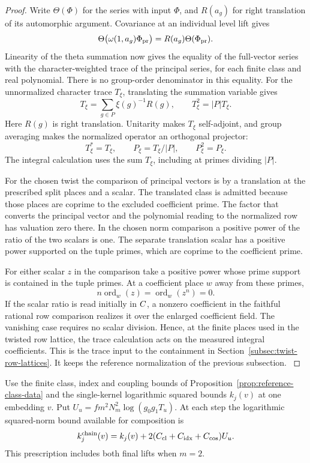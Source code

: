 \begin{proof}
Write \(\Theta(\Phi)\) for the series with input \(\Phi\), and \(R(a_g)\) for right translation of its automorphic argument. Covariance at an individual level lift gives
\[
 \Theta\bigl(\omega(1,a_g)\Phi_{\rm pr}\bigr)=R(a_g)\Theta(\Phi_{\rm pr}).
\]
Linearity of the theta summation now gives the equality
of the full-vector series with the character-weighted
trace of the principal series, for each finite class and
real polynomial. There is no group-order denominator in
this equality. For the unnormalized character trace \(T_\xi\), translating the
summation variable gives
\[
 T_\xi=\sum_{g\in P}\xi(g)^{-1}R(g),\qquad
 T_\xi^2=|P|T_\xi .
\]
Here \(R(g)\) is right translation. Unitarity makes \(T_\xi\) self-adjoint, and group averaging makes the normalized operator an orthogonal projector:
\[
 T_\xi^*=T_\xi,\qquad P_\xi=T_\xi/|P|,\qquad P_\xi^2=P_\xi .
\] The integral
calculation uses the sum \(T_\xi\), including at primes dividing
\(|P|\).
\label{cor:selected-norms-2}

For the chosen twist the comparison of principal vectors
is by a translation at the prescribed split places and a
scalar. The translated class is admitted because those
places are coprime to the excluded coefficient prime.
The factor that converts the principal vector and the
polynomial reading to the normalized row has valuation
zero there. In the chosen norm comparison a positive
power of the ratio of the two scalars is one. The separate
translation scalar has a positive power supported on the
tuple primes, which are coprime to the coefficient prime.

For either scalar \(z\) in the comparison take a positive power
whose prime support is contained in the tuple primes. At a coefficient
place \(w\) away from these primes,
\[
 n\operatorname{ord}_w(z)=\operatorname{ord}_w(z^n)=0.
\]
If the scalar ratio is read initially in \(C\), a nonzero
coefficient in the faithful rational row comparison
realizes it over the enlarged coefficient field. The
vanishing case requires no scalar division. Hence, at the
finite places used in the twisted row lattice, the trace
calculation acts on the measured integral coefficients.
This is the trace input to the containment in
Section~\ref{subsec:twist-row-lattices}. It keeps the
reference normalization of the previous subsection.
\label{cor:selected-norms-3}
\end{proof}

\begin{proposition}\label{prop:selected-step-cost}
Use the finite class, index and coupling bounds of
Proposition~\ref{prop:reference-class-data} and the single-kernel
logarithmic squared bounds \(k_j(v)\) at one embedding \(v\).
Put \(U_u=fm^2N_m^2\log(g_0g_1T_u)\). At each step the logarithmic squared-norm bound available for composition is
\[
 k^{\rm chain}_j(v)=k_j(v)+2(C_{\rm cl}+C_{\rm idx}+C_{\rm cos})U_u.
\]
This prescription includes both final lifts when \(m=2\).
\end{proposition}

